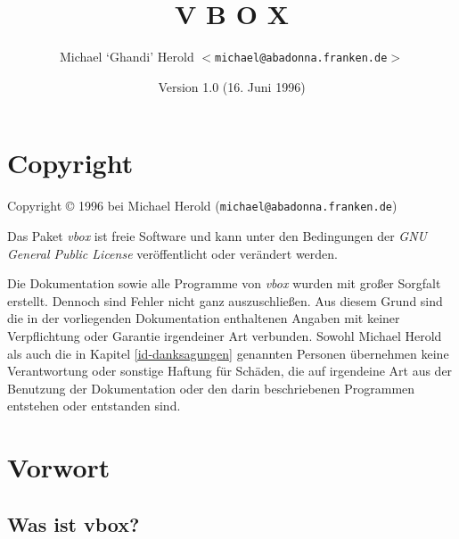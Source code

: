 
\title{V B O X}
\author{Michael `Ghandi' Herold {\(<\)}{\tt michael@abadonna.franken.de}{\(>\)}}
\date{Version 1.0 (16. Juni 1996)}



\maketitle
\tableofcontents





\section{Copyright\label{id-copyright}}





Copyright {\copyright} 1996 bei Michael Herold ({\tt michael@abadonna.franken.de})

Das Paket {\em vbox\/} ist freie Software und kann unter den Bedingungen
der {\em GNU General Public License\/} ver\"{o}ffentlicht oder ver\"{a}ndert
werden.

Die Dokumentation sowie alle Programme von {\em vbox\/} wurden mit gro{\ss}er
Sorgfalt erstellt. Dennoch sind Fehler nicht ganz auszuschlie{\ss}en. Aus diesem
Grund sind die in der vorliegenden Dokumentation enthaltenen Angaben mit
keiner Verpflichtung oder Garantie irgendeiner Art verbunden. Sowohl Michael
Herold als auch die in Kapitel \ref{id-danksagungen} genannten Personen \"{u}bernehmen keine Verantwortung oder
sonstige Haftung f\"{u}r Sch\"{a}den, die auf irgendeine Art aus der Benutzung der
Dokumentation oder den darin beschriebenen Programmen entstehen oder
entstanden sind.






\section{Vorwort\label{id-vorwort}}








\subsection{Was ist vbox?\label{id-vorwort-wasistvbox}}



